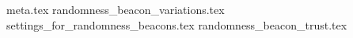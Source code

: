 {meta.tex}
{randomness_beacon_variations.tex}
{settings_for_randomness_beacons.tex}
{randomness_beacon_trust.tex}

